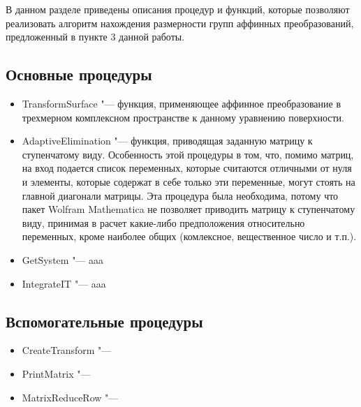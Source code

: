 \documentclass[../main.tex]{subfiles}
\begin{document}
В данном разделе приведены описания процедур и функций, которые позволяют реализовать алгоритм нахождения размерности групп аффинных преобразований, предложенный в пункте 3 данной работы. 

\subsection{Основные процедуры}

\begin{itemize}

\item {\ttfamily TransformSurface} "--- функция, применяющее аффинное преобразование в трехмерном комплексном пространстве к данному уравнению поверхности. 

\item {\ttfamily AdaptiveElimination} "--- функция, приводящая заданную матрицу к ступенчатому виду. Особенность этой процедуры в том, что, помимо матриц, на вход подается список переменных, которые считаются отличными от нуля и элементы, которые содержат в себе только эти переменные, могут стоять на главной диагонали матрицы. Эта процедура была необходима, потому что пакет {\ttfamily Wolfram Mathematica} не позволяет приводить матрицу к ступенчатому виду, принимая в расчет какие-либо предположения относительно переменных, кроме наиболее общих (комлексное, вещественное число и т.п.).

\item {\ttfamily GetSystem} "---  aaa

\item {\ttfamily IntegrateIT} "---  aaa

\end{itemize}

\subsection{Вспомогательные процедуры}
\begin{itemize}
\item {\ttfamily CreateTransform} "---

\item {\ttfamily PrintMatrix} "---

\item {\ttfamily MatrixReduceRow} "---

\end{itemize}
\end{document}
